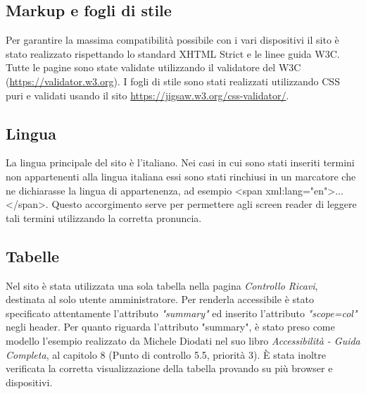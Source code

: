 \subsection{Markup e fogli di stile}
Per garantire la massima compatibilità possibile con i vari dispositivi il sito è stato realizzato rispettando lo standard XHTML Strict e le linee guida W3C. Tutte le pagine sono state validate utilizzando il validatore del W3C (\url{https://validator.w3.org}). \newline
I fogli di stile sono stati realizzati utilizzando CSS puri e validati usando il sito \url{https://jigsaw.w3.org/css-validator/}.

\subsection{Lingua}
La lingua principale del sito è l'italiano. Nei casi in cui sono stati inseriti termini non appartenenti alla lingua italiana essi sono stati rinchiusi in un marcatore che ne dichiarasse la lingua di appartenenza, ad esempio <span xml:lang="en">...</span>. Questo accorgimento serve per permettere agli screen reader di leggere tali termini utilizzando la corretta pronuncia.

\subsection{Tabelle}
Nel sito è stata utilizzata una sola tabella nella pagina \textit{Controllo Ricavi}, destinata al solo utente amministratore. Per renderla accessibile è stato specificato attentamente l’attributo \textit{"summary"} ed inserito l’attributo \textit{"scope=col"} negli header. \newline
Per quanto riguarda l'attributo "summary", è stato preso come modello l'esempio realizzato da Michele Diodati nel suo libro \textit{Accessibilità - Guida Completa}, al capitolo 8 (Punto di controllo 5.5, priorità 3). \newline
È stata inoltre verificata la corretta visualizzazione della tabella provando su più browser e dispositivi.

